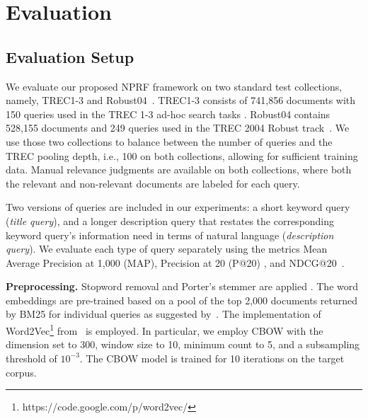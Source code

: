 \documentclass[11pt,a4paper]{article}
\begin{document}
 \vspace{\vignore}
\section{Evaluation}\label{sec.evaluation}
\vspace{\vignore}
\subsection{Evaluation Setup}\label{sec.evalsetup}
\vspace{\vignore}

We evaluate our proposed NPRF framework on two standard test collections, namely, \textsc{TREC}1-3 \cite{DBLP:conf/sigir/Harman93} and Robust04~\cite{DBLP:conf/trec/Voorhees04b}. TREC1-3 consists of 741,856 documents with 150 queries used in the TREC 1-3 ad-hoc search tasks \cite{DBLP:conf/sigir/Harman93,DBLP:conf/trec/Harman94,DBLP:journals/ipm/Harman95a}. Robust04 contains 528,155 documents and 249 queries used in the TREC 2004 Robust track~\cite{DBLP:conf/trec/Voorhees04b}. We use those two collections to balance between the number of queries and the TREC pooling depth, i.e., 100 on both collections, allowing for sufficient training data. Manual relevance judgments are available on both collections, where both the relevant and non-relevant documents are labeled for each query. 


Two versions of queries are included in our experiments: a short keyword query (\textit{title query}), and a longer description query that restates the corresponding keyword query's information need in terms of natural language (\textit{description query}). We evaluate each type of query separately using the metrics Mean Average Precision at 1,000 (MAP), Precision at 20 (P@20) \cite{DBLP:books/daglib/0021593}, and NDCG@20~\cite{Jarvelin:2002:CGE:582415.582418}.

\noindent \textbf{Preprocessing.} Stopword removal and Porter's stemmer are applied \cite{DBLP:books/daglib/0021593}. The word embeddings are pre-trained based on 
a pool of the top 2,000 documents returned by BM25 for individual queries
as suggested by~\cite{DBLP:conf/acl/0001MC16}.
The implementation of Word2Vec\footnote{https://code.google.com/p/word2vec/} 
from~\cite{word2vec} is employed.
In particular, we employ CBOW with the dimension set to 300, window size to 10, minimum count to 5,
and a subsampling threshold of $10^{-3}$.
The CBOW model is trained for 10 iterations on the target corpus.
\end{document}
